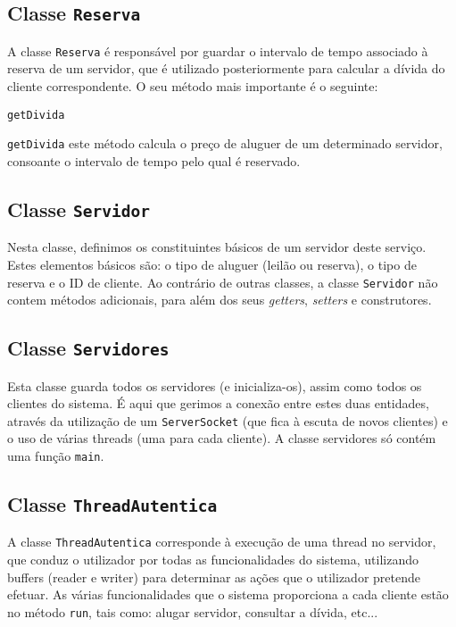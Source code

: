 \documentclass[11pt]{article}
\newcommand{\code}{\texttt}
\begin{document}
\subsection{Classe \code{Reserva}}
A classe \code{Reserva} é responsável por guardar o intervalo de tempo associado à reserva de um servidor, que é utilizado posteriormente para calcular a dívida do cliente correspondente. O seu método mais importante é o seguinte:

\begin{labeling}{\code{getDivida}}
    \item [\code{getDivida}] este método calcula o preço de aluguer de um determinado servidor, consoante o intervalo de tempo pelo qual é reservado.
\end{labeling}

\subsection{Classe \code{Servidor}}

Nesta classe, definimos os constituintes básicos de um servidor deste serviço. Estes elementos básicos são: o tipo de aluguer (leilão ou reserva), o tipo de reserva e o ID de cliente. Ao contrário de outras classes, a classe \code{Servidor} não contem métodos adicionais, para além dos seus \emph{getters}, \emph{setters} e construtores.

\subsection{Classe \code{Servidores}}

Esta classe guarda todos os servidores (e inicializa-os), assim como todos os clientes do sistema. É aqui que gerimos a conexão entre estes duas entidades, através da utilização de um \code{ServerSocket} (que fica à escuta de novos clientes) e o uso de várias threads (uma para cada cliente).
A classe servidores só contém uma função \code{main}.

\subsection{Classe \code{ThreadAutentica}}

A classe \code{ThreadAutentica} corresponde à execução de uma thread no servidor, que conduz o utilizador por todas as funcionalidades do sistema, utilizando buffers (reader e writer) para determinar as ações que o utilizador pretende efetuar. As várias funcionalidades que o sistema proporciona a cada cliente estão no método \code{run}, tais como: alugar servidor, consultar a dívida, etc...
\end{document}
